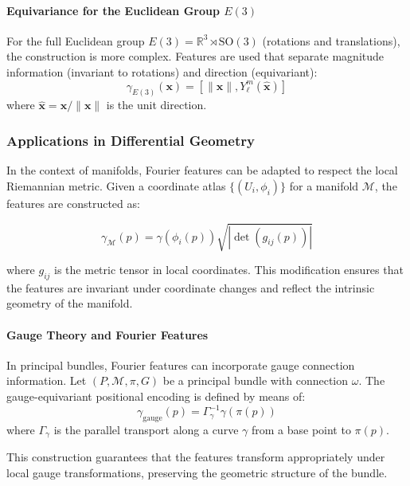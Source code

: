 \paragraph{Equivariance for the Euclidean Group $E(3)$}

For the full Euclidean group $E(3) = \mathbb{R}^3 \rtimes \text{SO}(3)$ (rotations and translations), the construction is more complex. Features are used that separate magnitude information (invariant to rotations) and direction (equivariant):
\begin{equation}
\gamma_{E(3)}(\mathbf{x}) = [\|\mathbf{x}\|, Y_\ell^m(\hat{\mathbf{x}})]
\end{equation}
where $\hat{\mathbf{x}} = \mathbf{x}/\|\mathbf{x}\|$ is the unit direction.

\subsubsection{Applications in Differential Geometry}

In the context of manifolds, Fourier features can be adapted to respect the local Riemannian metric. Given a coordinate atlas $\{(U_i, \phi_i)\}$ for a manifold $\mathcal{M}$, the features are constructed as:

\begin{equation}
\gamma_{\mathcal{M}}(p) = \gamma(\phi_i(p)) \sqrt{|\det(g_{ij}(p))|}
\end{equation}

where $g_{ij}$ is the metric tensor in local coordinates. This modification ensures that the features are invariant under coordinate changes and reflect the intrinsic geometry of the manifold.

\paragraph{Gauge Theory and Fourier Features}

In principal bundles, Fourier features can incorporate gauge connection information. Let $(P, \mathcal{M}, \pi, G)$ be a principal bundle with connection $\omega$. The gauge-equivariant positional encoding is defined by means of:
\begin{equation}
\gamma_{\text{gauge}}(p) = \Gamma_\gamma^{-1} \gamma(\pi(p))
\end{equation}
where $\Gamma_\gamma$ is the parallel transport along a curve $\gamma$ from a base point to $\pi(p)$.

This construction guarantees that the features transform appropriately under local gauge transformations, preserving the geometric structure of the bundle.


